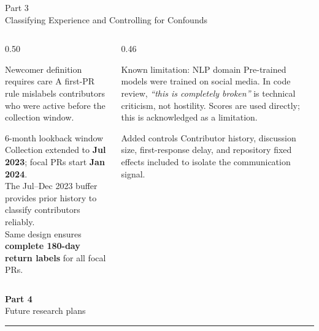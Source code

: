 \documentclass[aspectratio=169,11pt]{beamer}
\begin{document}
\begin{frame}{Part 3\\Classifying Experience and Controlling for Confounds}

\begin{columns}[T]
\begin{column}{0.50\textwidth}
\begin{alertblock}{Newcomer definition requires care}
A first-PR rule mislabels contributors who were active before the collection window.
\end{alertblock}

\vspace{0.2em}
\begin{exampleblock}{6-month lookback window}
Collection extended to \textbf{Jul 2023}; focal PRs start \textbf{Jan 2024}.\\
The Jul--Dec 2023 buffer provides prior history to classify contributors reliably.\\
Same design ensures \textbf{complete 180-day return labels} for all focal PRs.
\end{exampleblock}
\end{column}

\begin{column}{0.46\textwidth}
\begin{block}{Known limitation: NLP domain}
Pre-trained models were trained on social media. In code review, \emph{``this is completely broken''} is
technical criticism, not hostility. Scores are used directly; this is acknowledged as a limitation.
\end{block}

\vspace{0.2em}
\begin{block}{Added controls}
Contributor history, discussion size, first-response delay, and repository fixed effects
included to isolate the communication signal.
\end{block}
\end{column}
\end{columns}

\end{frame}

\begin{frame}
\vfill
\begin{center}
  {\Large\bfseries\color{accentblue} Part 4}\\[0.5em]
  {\large Future research plans}\\[0.3em]
  {\color{darkblue}\rule{0.55\textwidth}{0.6pt}}
\end{center}
\vfill
\end{frame}
\end{document}
